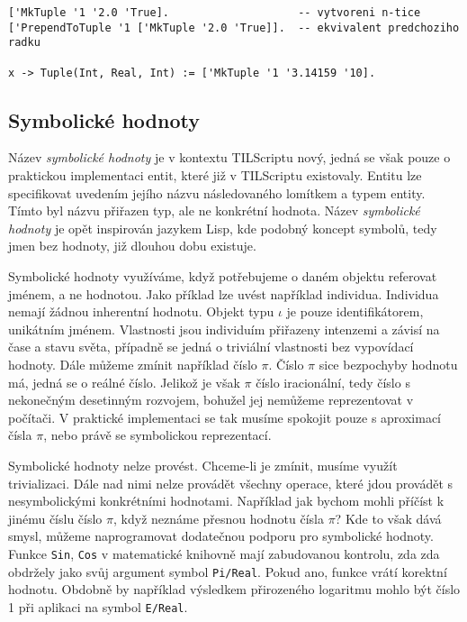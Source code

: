 \begin{lstlisting}[caption={Příklad využití n-tic}]
['MkTuple '1 '2.0 'True].                    -- vytvoreni n-tice
['PrependToTuple '1 ['MkTuple '2.0 'True]].  -- ekvivalent predchoziho radku

x -> Tuple(Int, Real, Int) := ['MkTuple '1 '3.14159 '10].
\end{lstlisting}

\subsection{Symbolické hodnoty} \label{symbolic-values}

Název \textit{symbolické hodnoty} je v kontextu TILScriptu nový, jedná se však pouze o praktickou
implementaci entit, které již v TILScriptu existovaly. Entitu lze specifikovat uvedením jejího
názvu následovaného lomítkem a typem entity. Tímto byl názvu přiřazen typ, ale ne konkrétní
hodnota. Název \textit{symbolické hodnoty} je opět inspirován jazykem Lisp, kde podobný koncept
symbolů, tedy jmen bez hodnoty, již dlouhou dobu existuje.

Symbolické hodnoty využíváme, když potřebujeme o daném objektu referovat jménem, a ne hodnotou.
Jako příklad lze uvést například individua. Individua nemají žádnou inherentní hodnotu. Objekt
typu $\iota$ je pouze identifikátorem, unikátním jménem. Vlastnosti jsou individuím přiřazeny
intenzemi a závisí na čase a stavu světa, případně se jedná o triviální vlastnosti bez vypovídací
hodnoty. Dále můžeme zmínit například číslo $\pi$. Číslo $\pi$ sice bezpochyby hodnotu má, jedná
se o reálné číslo. Jelikož je však $\pi$ číslo iracionální, tedy číslo s nekonečným desetinným
rozvojem, bohužel jej nemůžeme reprezentovat v počítači. V praktické implementaci se tak musíme
spokojit pouze s aproximací čísla $\pi$, nebo právě se symbolickou reprezentací.

Symbolické hodnoty nelze provést. Chceme-li je zmínit, musíme využít trivializaci. Dále nad nimi
nelze provádět všechny operace, které jdou provádět s nesymbolickými konkrétními hodnotami.
Například jak bychom mohli příčíst k jinému číslu číslo $\pi$, když neznáme přesnou hodnotu čísla
$\pi$? Kde to však dává smysl, můžeme naprogramovat dodatečnou podporu pro symbolické hodnoty.
Funkce \lstinline{Sin}, \lstinline{Cos} v matematické knihovně mají zabudovanou kontrolu, zda
zda obdržely jako svůj argument symbol \lstinline{Pi/Real}. Pokud ano, funkce vrátí korektní
hodnotu. Obdobně by například výsledkem přirozeného logaritmu mohlo být číslo 1 při aplikaci
na symbol \lstinline{E/Real}.

